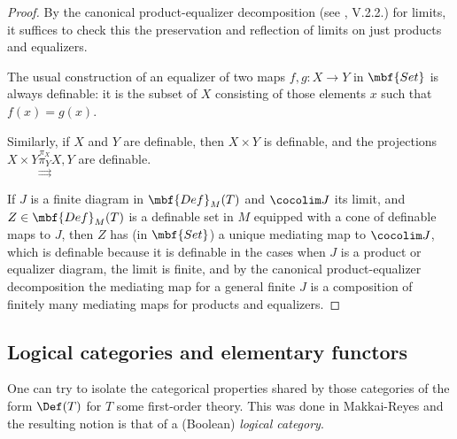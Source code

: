 \begin{proof} By the canonical product-equalizer decomposition (see \cite{maclane-cwm}, V.2.2.) for limits, it suffices to check this the preservation and reflection of limits on just products and equalizers.

  The usual construction of an equalizer of two maps \(f,g : X \to Y\) in \(\mbf{Set}\) is always definable: it is the subset of $X$ consisting of those elements $x$ such that $f(x) = g(x)$.

  Similarly, if $X$ and $Y$ are definable, then $X \times Y$ is definable, and the projections $X \times Y \overset{\pi_X}{\underset{\rightrightarrows}{\pi_Y}} X, Y$ are definable.

  If \(J\) is a finite diagram in \(\mbf{Def}_M(T)\) and \(\cocolim J\) its limit, and \(Z \in \mbf{Def}_{M}(T)\) is a definable set in \(M\) equipped with a cone of definable maps to \(J\), then \(Z\) has (in \(\mbf{Set}\)) a unique mediating map to \(\cocolim J\), which is definable because it is definable in the cases when \(J\) is a product or equalizer diagram, the limit is finite, and by the canonical product-equalizer decomposition the mediating map for a general finite $J$ is a composition of finitely many mediating maps for products and equalizers.
\end{proof}

\subsection{Logical categories and elementary functors}
One can try to isolate the categorical properties shared by those categories of the form $\Def(T)$ for $T$ some first-order theory. This was done in Makkai-Reyes \cite{makkai-reyes} and the resulting notion is that of a (Boolean) \emph{logical category}.

